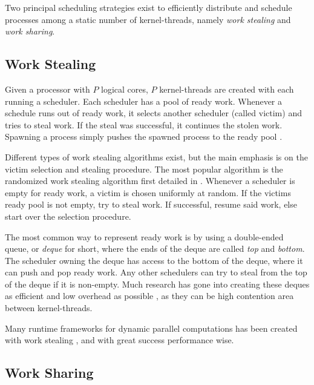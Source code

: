 Two principal scheduling strategies exist to efficiently distribute and schedule processes among a static number of kernel\hyp{}threads, namely \textit{work stealing} and \textit{work sharing}.


\subsection{Work Stealing}
\label{subsec:work_stealing}


Given a processor with $P$ logical cores, $P$ kernel\hyp{}threads are created with each running a scheduler. Each scheduler has a pool of ready work. Whenever a schedule runs out of ready work, it selects another scheduler (called victim) and tries to steal work. If the steal was successful, it continues the stolen work. Spawning a process simply pushes the spawned process to the ready pool \citep{blumofe1999scheduling}.

Different types of work stealing algorithms exist, but the main emphasis is on the victim selection and stealing procedure. The most popular algorithm is the randomized work stealing algorithm first detailed in \citet{blumofe1999scheduling}. Whenever a scheduler is empty for ready work, a victim is chosen uniformly at random. If the victims ready pool is not empty, try to steal work. If successful, resume said work, else start over the selection procedure.

The most common way to represent ready work is by using a double\hyp{}ended queue, or \textit{deque} for short, where the ends of the deque are called \textit{top} and \textit{bottom}. The scheduler owning the deque has access to the bottom of the deque, where it can push and pop ready work. Any other schedulers can try to steal from the top of the deque if it is non\hyp{}empty. Much research has gone into creating these deques as efficient and low overhead as possible \citep{chase2005dynamic,le2013correct}, as they can be high contention area between kernel\hyp{}threads.

Many runtime frameworks for dynamic parallel computations has been created with work stealing \citep{blumofe1996cilk,sunderam1990pvm}, and with great success performance wise.


\subsection{Work Sharing}
\label{subsec:work_sharing}


